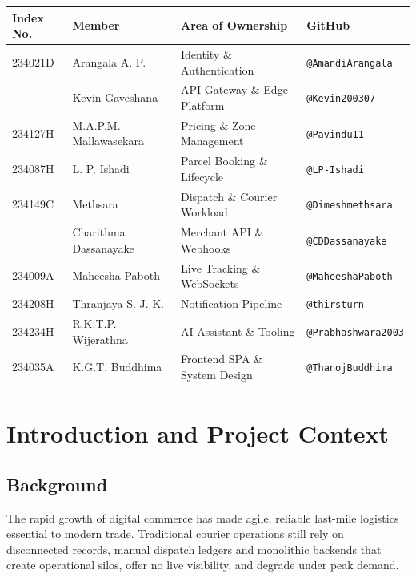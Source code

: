 \documentclass[11pt,a4paper,oneside,openany]{report}
\newcommand{\code}[1]{\texttt{\small #1}}
\begin{document}
\vspace{0.6cm}
\begin{center}
\small
\begin{tabular}{@{}p{2.2cm}p{4.3cm}p{4.2cm}p{3.4cm}@{}}
\toprule
\textbf{Index No.} & \textbf{Member} & \textbf{Area of Ownership} & \textbf{GitHub} \\
\midrule
234021D & Arangala A. P.        & Identity \& Authentication   & \code{@AmandiArangala} \\
        & Kevin Gaveshana       & API Gateway \& Edge Platform & \code{@Kevin200307} \\
234127H & M.A.P.M. Mallawasekara& Pricing \& Zone Management   & \code{@Pavindu11} \\
234087H & L. P. Ishadi          & Parcel Booking \& Lifecycle  & \code{@LP-Ishadi} \\
234149C & Methsara              & Dispatch \& Courier Workload & \code{@Dimeshmethsara} \\
        & Charithma Dassanayake & Merchant API \& Webhooks     & \code{@CDDassanayake} \\
234009A & Maheesha Paboth       & Live Tracking \& WebSockets  & \code{@MaheeshaPaboth} \\
234208H & Thranjaya S. J. K.    & Notification Pipeline        & \code{@thirsturn} \\
234234H & R.K.T.P. Wijerathna   & AI Assistant \& Tooling      & \code{@Prabhashwara2003} \\
234035A & K.G.T. Buddhima       & Frontend SPA \& System Design& \code{@ThanojBuddhima} \\
\bottomrule
\end{tabular}
\end{center}

\tableofcontents

\chapter{Introduction and Project Context}

\section{Background}
The rapid growth of digital commerce has made agile, reliable last-mile logistics essential to
modern trade. Traditional courier operations still rely on disconnected records, manual dispatch
ledgers and monolithic backends that create operational silos, offer no live visibility, and
degrade under peak demand.
\end{document}
